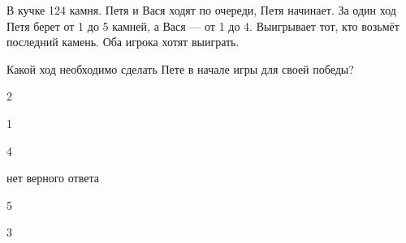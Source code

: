 
\begin{question}
В кучке 124 камня. Петя и Вася ходят по очереди, Петя начинает.
За один ход Петя берет от 1 до 5 камней, а Вася --- от 1 до 4.
Выигрывает тот, кто возьмёт последний камень. Оба игрока хотят выиграть.

Какой ход необходимо сделать Пете в начале игры для своей победы?
\begin{answerlist}
  \item 2
  \item 1
  \item 4
  \item нет верного ответа
  \item 5
  \item 3
\end{answerlist}
\end{question}


